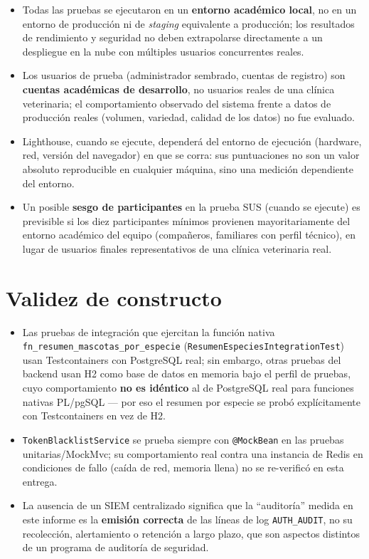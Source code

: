 \begin{itemize}[nosep]
  \item Todas las pruebas se ejecutaron en un \textbf{entorno acad\'emico
    local}, no en un entorno de producci\'on ni de \emph{staging}
    equivalente a producci\'on; los resultados de rendimiento y seguridad
    no deben extrapolarse directamente a un despliegue en la nube con
    m\'ultiples usuarios concurrentes reales.
  \item Los usuarios de prueba (administrador sembrado, cuentas de
    registro) son \textbf{cuentas acad\'emicas de desarrollo}, no usuarios
    reales de una cl\'inica veterinaria; el comportamiento observado del
    sistema frente a datos de producci\'on reales (volumen, variedad,
    calidad de los datos) no fue evaluado.
  \item Lighthouse, cuando se ejecute, depender\'a del entorno de ejecuci\'on
    (hardware, red, versi\'on del navegador) en que se corra: sus
    puntuaciones no son un valor absoluto reproducible en cualquier
    m\'aquina, sino una medici\'on dependiente del entorno.
  \item Un posible \textbf{sesgo de participantes} en la prueba SUS
    (cuando se ejecute) es previsible si los diez participantes m\'inimos
    provienen mayoritariamente del entorno acad\'emico del equipo
    (compa\~neros, familiares con perfil t\'ecnico), en lugar de usuarios
    finales representativos de una cl\'inica veterinaria real.
\end{itemize}

\section{Validez de constructo}

\begin{itemize}[nosep]
  \item Las pruebas de integraci\'on que ejercitan la funci\'on nativa
    \texttt{fn_resumen_mascotas_por_especie}
    (\texttt{ResumenEspeciesIntegrationTest}) usan Testcontainers con
    PostgreSQL real; sin embargo, otras pruebas del backend usan H2 como
    base de datos en memoria bajo el perfil de pruebas, cuyo comportamiento
    \textbf{no es id\'entico} al de PostgreSQL real para funciones nativas
    PL/pgSQL --- por eso el resumen por especie se prob\'o expl\'icitamente
    con Testcontainers en vez de H2.
  \item \texttt{TokenBlacklistService} se prueba siempre con
    \texttt{@MockBean} en las pruebas unitarias/MockMvc; su comportamiento
    real contra una instancia de Redis en condiciones de fallo (ca\'ida de
    red, memoria llena) no se re-verific\'o en esta entrega.
  \item La ausencia de un SIEM centralizado significa que la
    ``auditor\'ia'' medida en este informe es la \textbf{emisi\'on
    correcta} de las l\'ineas de log \texttt{AUTH_AUDIT}, no su
    recolecci\'on, alertamiento o retenci\'on a largo plazo, que son
    aspectos distintos de un programa de auditor\'ia de seguridad.
\end{itemize}

